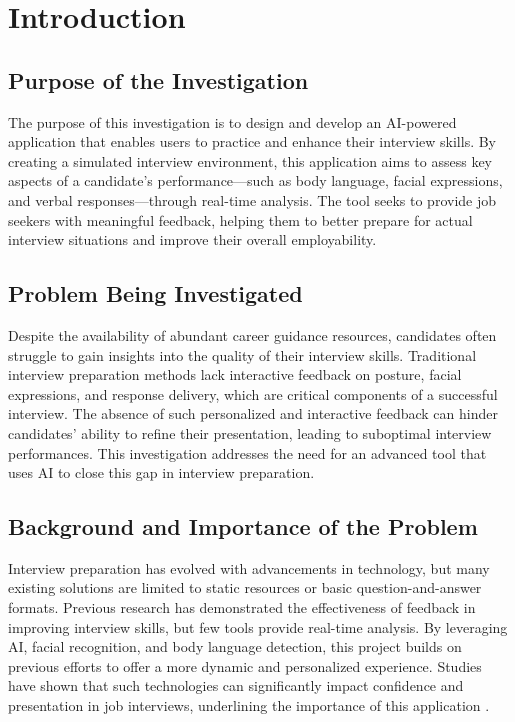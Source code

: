 \chapter{Introduction} \label{sec
}

\section{Purpose of the Investigation}

The purpose of this investigation is to design and develop an AI-powered application that enables users to practice and enhance their interview skills. By creating a simulated interview environment, this application aims to assess key aspects of a candidate’s performance—such as body language, facial expressions, and verbal responses—through real-time analysis. The tool seeks to provide job seekers with meaningful feedback, helping them to better prepare for actual interview situations and improve their overall employability.

\section{Problem Being Investigated}

Despite the availability of abundant career guidance resources, candidates often struggle to gain insights into the quality of their interview skills. Traditional interview preparation methods lack interactive feedback on posture, facial expressions, and response delivery, which are critical components of a successful interview. The absence of such personalized and interactive feedback can hinder candidates’ ability to refine their presentation, leading to suboptimal interview performances. This investigation addresses the need for an advanced tool that uses AI to close this gap in interview preparation.

\section{Background and Importance of the Problem}

Interview preparation has evolved with advancements in technology, but many existing solutions are limited to static resources or basic question-and-answer formats. Previous research has demonstrated the effectiveness of feedback in improving interview skills, but few tools provide real-time analysis. By leveraging AI, facial recognition, and body language detection, this project builds on previous efforts to offer a more dynamic and personalized experience. Studies have shown that such technologies can significantly impact confidence and presentation in job interviews, underlining the importance of this application \cite{test}.


